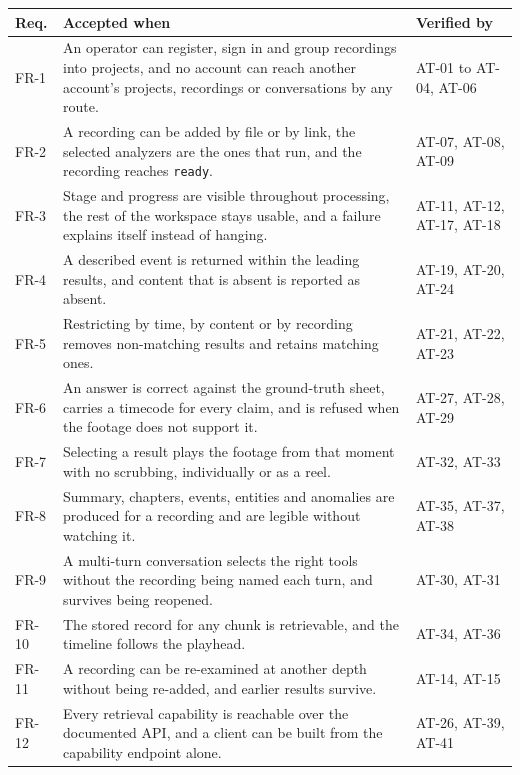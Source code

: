 \begin{table}[htbp]
\centering
\footnotesize
\begin{tabularx}{\textwidth}{@{}L{1.2cm}XL{2.7cm}@{}}
\toprule
\textbf{Req.} & \textbf{Accepted when} & \textbf{Verified by} \\
\midrule
FR-1  & An operator can register, sign in and group recordings into projects, and no account can reach another account's projects, recordings or conversations by any route. & AT-01 to AT-04, AT-06 \\
FR-2  & A recording can be added by file or by link, the selected analyzers are the ones that run, and the recording reaches \texttt{ready}. & AT-07, AT-08, AT-09 \\
FR-3  & Stage and progress are visible throughout processing, the rest of the workspace stays usable, and a failure explains itself instead of hanging. & AT-11, AT-12, AT-17, AT-18 \\
FR-4  & A described event is returned within the leading results, and content that is absent is reported as absent. & AT-19, AT-20, AT-24 \\
FR-5  & Restricting by time, by content or by recording removes non-matching results and retains matching ones. & AT-21, AT-22, AT-23 \\
FR-6  & An answer is correct against the ground-truth sheet, carries a timecode for every claim, and is refused when the footage does not support it. & AT-27, AT-28, AT-29 \\
FR-7  & Selecting a result plays the footage from that moment with no scrubbing, individually or as a reel. & AT-32, AT-33 \\
FR-8  & Summary, chapters, events, entities and anomalies are produced for a recording and are legible without watching it. & AT-35, AT-37, AT-38 \\
FR-9  & A multi-turn conversation selects the right tools without the recording being named each turn, and survives being reopened. & AT-30, AT-31 \\
FR-10 & The stored record for any chunk is retrievable, and the timeline follows the playhead. & AT-34, AT-36 \\
FR-11 & A recording can be re-examined at another depth without being re-added, and earlier results survive. & AT-14, AT-15 \\
FR-12 & Every retrieval capability is reachable over the documented API, and a client can be built from the capability endpoint alone. & AT-26, AT-39, AT-41 \\

\end{tabularx}
\end{table}
